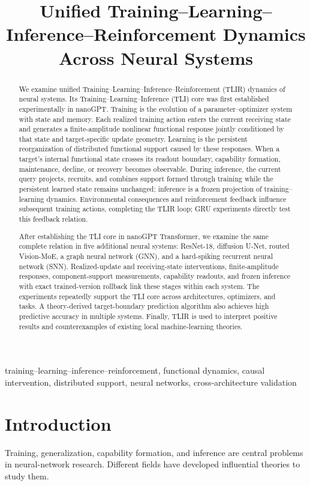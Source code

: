 \documentclass[conference,10pt]{IEEEtran}
\title{Unified Training--Learning--Inference--Reinforcement Dynamics Across Neural Systems}
\author{\IEEEauthorblockN{Author names to be inserted}\IEEEauthorblockA{Institution and contact details to be inserted}}
\begin{document}
\maketitle
\begin{abstract}
We examine unified Training--Learning--Inference--Reinforcement (TLIR) dynamics of neural systems. Its Training--Learning--Inference (TLI) core was first established experimentally in nanoGPT. Training is the evolution of a parameter--optimizer system with state and memory. Each realized training action enters the current receiving state and generates a finite-amplitude nonlinear functional response jointly conditioned by that state and target-specific update geometry. Learning is the persistent reorganization of distributed functional support caused by these responses. When a target's internal functional state crosses its readout boundary, capability formation, maintenance, decline, or recovery becomes observable. During inference, the current query projects, recruits, and combines support formed through training while the persistent learned state remains unchanged; inference is a frozen projection of training--learning dynamics. Environmental consequences and reinforcement feedback influence subsequent training actions, completing the TLIR loop; GRU experiments directly test this feedback relation.

After establishing the TLI core in nanoGPT Transformer, we examine the same complete relation in five additional neural systems: ResNet-18, diffusion U-Net, routed Vision-MoE, a graph neural network (GNN), and a hard-spiking recurrent neural network (SNN). Realized-update and receiving-state interventions, finite-amplitude responses, component-support measurements, capability readouts, and frozen inference with exact trained-version rollback link these stages within each system. The experiments repeatedly support the TLI core across architectures, optimizers, and tasks. A theory-derived target-boundary prediction algorithm also achieves high predictive accuracy in multiple systems. Finally, TLIR is used to interpret positive results and counterexamples of existing local machine-learning theories.
\end{abstract}
\begin{IEEEkeywords}
training--learning--inference--reinforcement, functional dynamics, causal intervention, distributed support, neural networks, cross-architecture validation
\end{IEEEkeywords}

\section{Introduction}
Training, generalization, capability formation, and inference are central problems in neural-network research. Different fields have developed influential theories to study them.
\end{document}

